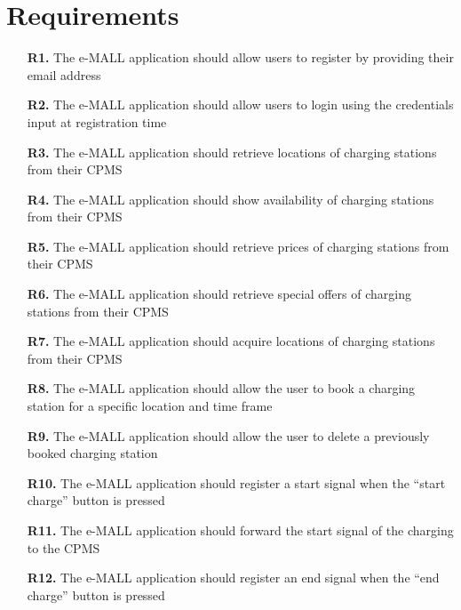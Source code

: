 \documentclass[12pt]{report}
\begin{document}
\section{Requirements}
\begin{itemize}
    \item[\textbf{R1.}]The e-MALL application should allow users to register by providing their email address
    
    \item[\textbf{R2.}]The e-MALL application should allow users to login using the credentials input at registration time
    
    \item[\textbf{R3.}]The e-MALL application should retrieve locations of charging stations from their CPMS
    
    \item[\textbf{R4.}]The e-MALL application should show availability of charging stations from their CPMS
    
    \item[\textbf{R5.}]The e-MALL application should retrieve prices of charging stations from their CPMS
    
    \item[\textbf{R6.}]The e-MALL application should retrieve special offers of charging stations from their CPMS
    
    \item[\textbf{R7.}]The e-MALL application should acquire locations of charging stations from their CPMS
    
    \item[\textbf{R8.}]The e-MALL application should allow the user to book a charging station for a specific location and time frame
    
    \item[\textbf{R9.}]The e-MALL application should allow the user to delete a previously booked charging station
    
    \item[\textbf{R10.}]The e-MALL application should register a start signal when the “start charge” button is pressed
    
    \item[\textbf{R11.}]The e-MALL application should forward the start signal of the charging to the CPMS 
    
    \item[\textbf{R12.}]The e-MALL application should register an end signal when the “end charge” button is pressed
    

\end{itemize}
\end{document}
